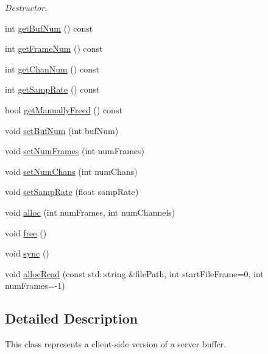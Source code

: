 \begin{DoxyCompactItemize}
\begin{DoxyCompactList}\small\item\em Destructor. \end{DoxyCompactList}\item 
int \hyperlink{classColliderPlusPlus_1_1Buffer_a0c00584a7afb6fc0e0a8791cd4a8f0b5}{get\-Buf\-Num} () const 
\item 
int \hyperlink{classColliderPlusPlus_1_1Buffer_a59f84ebba0ce0c7707dbf37ef8a9ac0f}{get\-Frame\-Num} () const 
\item 
int \hyperlink{classColliderPlusPlus_1_1Buffer_a8f782a6d9a03b47ddaa3067e4c09bc63}{get\-Chan\-Num} () const 
\item 
int \hyperlink{classColliderPlusPlus_1_1Buffer_aa0c5ce2e5ede311b515b7748fc7074d5}{get\-Samp\-Rate} () const 
\item 
bool \hyperlink{classColliderPlusPlus_1_1Buffer_a021329a8faaecd4ebb58b291b1ded6c4}{get\-Manually\-Freed} () const 
\item 
void \hyperlink{classColliderPlusPlus_1_1Buffer_a42b8f222c59b41583c079892329ed4b3}{set\-Buf\-Num} (int buf\-Num)
\item 
void \hyperlink{classColliderPlusPlus_1_1Buffer_aa6e5dd22f61dc017b2269ab591f774c1}{set\-Num\-Frames} (int num\-Frames)
\item 
void \hyperlink{classColliderPlusPlus_1_1Buffer_a10dad9102c89405bd2f90d81528d1fd6}{set\-Num\-Chans} (int num\-Chans)
\item 
void \hyperlink{classColliderPlusPlus_1_1Buffer_a3eb246f4be7e091d799af74416450e8b}{set\-Samp\-Rate} (float samp\-Rate)
\item 
void \hyperlink{classColliderPlusPlus_1_1Buffer_a2d9c1a08d1e3080ed0b4a3780b18be15}{alloc} (int num\-Frames, int num\-Channels)
\item 
void \hyperlink{classColliderPlusPlus_1_1Buffer_ad4eb930f170b4ae398239750cb981f73}{free} ()
\item 
void \hyperlink{classColliderPlusPlus_1_1Buffer_af6efd69eef95bf0202498acc256e7f3f}{sync} ()
\item 
void \hyperlink{classColliderPlusPlus_1_1Buffer_a57e3976a06f74c7605cb9523da6367c7}{alloc\-Read} (const std\-::string \&file\-Path, int start\-File\-Frame=0, int num\-Frames=-\/1)
\end{DoxyCompactItemize}


\subsection{Detailed Description}
This class represents a client-\/side version of a server buffer. 

